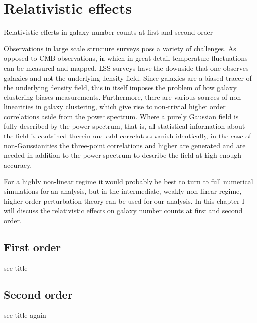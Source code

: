 \chapter{Relativistic effects}
\label{chapter:introreleff}

Relativistic effects in galaxy number counts at first and second order

Observations in large scale structure surveys pose a variety of challenges. As opposed to CMB observations, in which in great detail temperature fluctuations can be measured and mapped, LSS surveys have the downside that one observes galaxies and not the underlying density field. Since galaxies are a biased tracer of the underlying density field, this in itself imposes the problem of how galaxy clustering biases measurements. Furthermore, there are various sources of non-linearities in galaxy clustering, which give rise to non-trivial higher order correlations aside from the power spectrum. Where a purely Gaussian field is fully described by the power spectrum, that is, all statistical information about the field is contained therein and odd correlators vanish identically, in the case of non-Gaussianities the three-point correlations and higher are generated and are needed in addition to the power spectrum to describe the field at high enough accuracy. 

For a highly non-linear regime it would probably be best to turn to full numerical simulations for an analysis, but in the intermediate, weakly non-linear regime, higher order perturbation theory can be used for our analysis. In this chapter I will discuss the relativistic effects on galaxy number counts at first and second order.  

\section{First order}

see title

\section{Second order}

see title again 